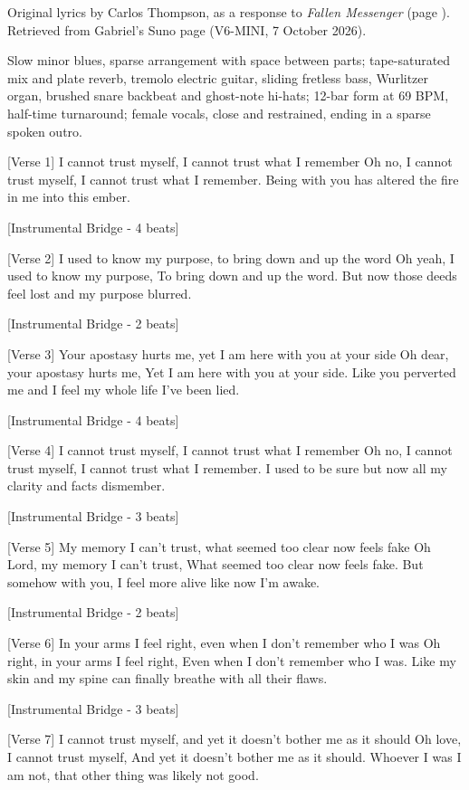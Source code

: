 \begin{notes}
Original lyrics by Carlos Thompson, as a response to \emph{Fallen Messenger} (page \pageref{sec:fallen-messenger}). Retrieved from Gabriel's Suno page (V6-MINI, 7 October 2026).
\end{notes}
\begin{style}
Slow minor blues, sparse arrangement with space between parts; tape-saturated mix and plate reverb, tremolo electric guitar, sliding fretless bass, Wurlitzer organ, brushed snare backbeat and ghost-note hi-hats; 12-bar form at 69 BPM, half-time turnaround; female vocals, close and restrained, ending in a sparse spoken outro.
\end{style}
\begin{lyrics}

[Verse 1]
I cannot trust myself, I cannot trust what I remember
Oh no, I cannot trust myself,
I cannot trust what I remember.
Being with you has altered the fire in me into this ember.

[Instrumental Bridge - 4 beats]

[Verse 2]
I used to know my purpose, to bring down and up the word
Oh yeah, I used to know my purpose,
To bring down and up the word.
But now those deeds feel lost and my purpose blurred.

[Instrumental Bridge - 2 beats]

[Verse 3]
Your apostasy hurts me, yet I am here with you at your side
Oh dear, your apostasy hurts me,
Yet I am here with you at your side.
Like you perverted me and I feel my whole life I've been lied.

[Instrumental Bridge - 4 beats]

[Verse 4]
I cannot trust myself, I cannot trust what I remember
Oh no, I cannot trust myself,
I cannot trust what I remember.
I used to be sure but now all my clarity and facts dismember.

[Instrumental Bridge - 3 beats]

[Verse 5]
My memory I can't trust, what seemed too clear now feels fake
Oh Lord, my memory I can't trust,
What seemed too clear now feels fake.
But somehow with you, I feel more alive like now I'm awake.

[Instrumental Bridge - 2 beats]

[Verse 6]
In your arms I feel right, even when I don't remember who I was
Oh right, in your arms I feel right,
Even when I don't remember who I was.
Like my skin and my spine can finally breathe with all their flaws.

[Instrumental Bridge - 3 beats]

[Verse 7]
I cannot trust myself, and yet it doesn't bother me as it should
Oh love, I cannot trust myself,
And yet it doesn't bother me as it should.
Whoever I was I am not, that other thing was likely not good.
\end{lyrics}

